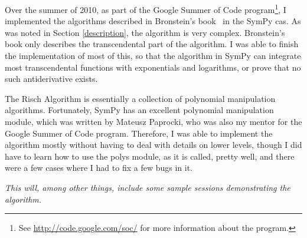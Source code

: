 Over the summer of 2010, as part of the Google Summer of Code
program\footnote{ See \url{http://code.google.com/soc/} for more
information about the program.}, I implemented the algorithms described
in Bronstein's book~\cite{bronstein2005symbolic} in the SymPy \gls{cas}.
As was noted in Section \ref{description}, the algorithm is very
complex. Bronstein's book only describes the \gls{transcendental} part
of the algorithm. I was able to finish the implementation of most of
this, so that the algorithm in SymPy can integrate most
\gls{transcendental} functions with exponentials and logarithms, or
prove that no such antiderivative exists.

The Risch Algorithm is essentially a collection of polynomial
manipulation algorithms.  Fortunately, SymPy has an excellent polynomial
manipulation module, which was written by Mateusz Paprocki, who was also
my mentor for the Google Summer of Code program.  Therefore, I was able
to implement the algorithm mostly without having to deal with details on
lower levels, though I did have to learn how to use the polys module, as
it is called, pretty well, and there were a few cases where I had to fix
a few bugs in it.

\emph{This will, among other things, include some
sample sessions demonstrating the algorithm.}
